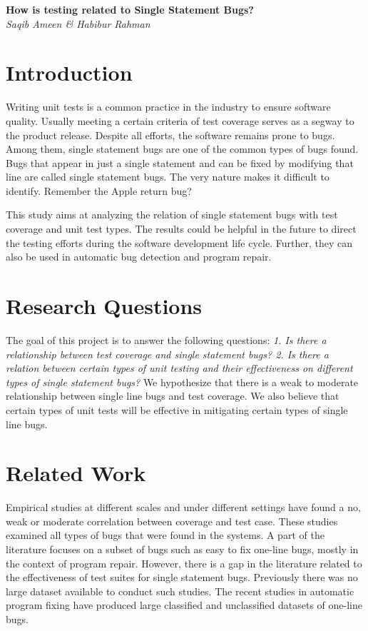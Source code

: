 \documentclass[11pt]{article}
\begin{document}
\begin{center}
{\bf \Large How is testing related to Single Statement Bugs?}\\
\vspace{.1in}
{\em Saqib Ameen \& Habibur Rahman}
\end{center}


\section{Introduction}

Writing unit tests is a common practice in the industry to ensure software quality. Usually meeting a certain criteria of test coverage serves as a segway to the product release. Despite all efforts, the software remains prone to bugs. Among them, single statement bugs are one of the common types of bugs found. Bugs that appear in just a single statement and can be fixed by modifying that line are called single statement bugs. The very nature makes it difficult to identify. Remember the Apple return bug?

This study aims at analyzing the relation of single statement bugs with test coverage and unit test types. The results could be helpful in the future to direct the testing efforts during the software development life cycle. Further, they can also be used in automatic bug detection and program repair.

\section{Research Questions}

The goal of this project is to answer the following questions: \textit{1. Is there a relationship between test coverage and single statement bugs? 2. Is there a relation between certain types of unit testing and their effectiveness on different types of single statement bugs?} We hypothesize that there is a weak to moderate relationship between single line bugs and test coverage. We also believe that certain types of unit tests will be effective in mitigating certain types of single line bugs.

\section{Related Work}

Empirical studies \cite{gren2017relation, antinyan2018mythical, inozemtseva2014coverage} at different scales and under different settings have found a no, weak or moderate correlation between coverage and test case. These studies examined all types of bugs that were found in the systems. A part of the literature focuses on a subset of bugs such as easy to fix one-line bugs, mostly in the context of program repair. However, there is a gap in the literature related to the effectiveness of test suites for single statement bugs. Previously there was no large dataset available to conduct such studies. The recent studies in automatic program fixing have produced large classified \cite{karampatsis2020often} and unclassified \cite{chen2019sequencer} datasets of one-line bugs.
\end{document}
